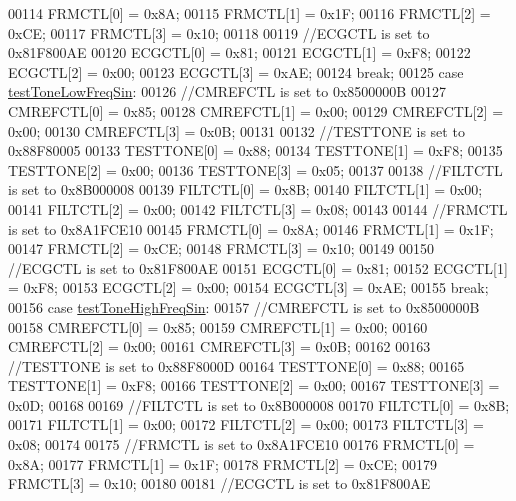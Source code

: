 \begin{DoxyCode}
00114         FRMCTL[0] = 0x8A;
00115         FRMCTL[1] = 0x1F;
00116         FRMCTL[2] = 0xCE;
00117         FRMCTL[3] = 0x10;
00118 
00119         \textcolor{comment}{//ECGCTL is set to 0x81F800AE}
00120         ECGCTL[0] = 0x81;
00121         ECGCTL[1] = 0xF8;
00122         ECGCTL[2] = 0x00;
00123         ECGCTL[3] = 0xAE;
00124         \textcolor{keywordflow}{break};
00125     \textcolor{keywordflow}{case} \hyperlink{group__Device-Facade_ggabf6e5cc9109a573e29add762dc36df9ba9ececd6d5264a0e5996556c6697a4f94}{testToneLowFreqSin}:
00126         \textcolor{comment}{//CMREFCTL is set to 0x8500000B}
00127         CMREFCTL[0] = 0x85;
00128         CMREFCTL[1] = 0x00;
00129         CMREFCTL[2] = 0x00;
00130         CMREFCTL[3] = 0x0B;
00131 
00132         \textcolor{comment}{//TESTTONE is set to 0x88F80005}
00133         TESTTONE[0] = 0x88;
00134         TESTTONE[1] = 0xF8;
00135         TESTTONE[2] = 0x00;
00136         TESTTONE[3] = 0x05;
00137 
00138         \textcolor{comment}{//FILTCTL is set to 0x8B000008}
00139         FILTCTL[0] = 0x8B;
00140         FILTCTL[1] = 0x00;
00141         FILTCTL[2] = 0x00;
00142         FILTCTL[3] = 0x08;
00143 
00144         \textcolor{comment}{//FRMCTL is set to 0x8A1FCE10}
00145         FRMCTL[0] = 0x8A;
00146         FRMCTL[1] = 0x1F;
00147         FRMCTL[2] = 0xCE;
00148         FRMCTL[3] = 0x10;
00149 
00150         \textcolor{comment}{//ECGCTL is set to 0x81F800AE}
00151         ECGCTL[0] = 0x81;
00152         ECGCTL[1] = 0xF8;
00153         ECGCTL[2] = 0x00;
00154         ECGCTL[3] = 0xAE;
00155         \textcolor{keywordflow}{break};
00156     \textcolor{keywordflow}{case} \hyperlink{group__Device-Facade_ggabf6e5cc9109a573e29add762dc36df9ba397d60b89ddb5aaf41d92c617868ed47}{testToneHighFreqSin}:
00157         \textcolor{comment}{//CMREFCTL is set to 0x8500000B}
00158         CMREFCTL[0] = 0x85;
00159         CMREFCTL[1] = 0x00;
00160         CMREFCTL[2] = 0x00;
00161         CMREFCTL[3] = 0x0B;
00162 
00163         \textcolor{comment}{//TESTTONE is set to 0x88F8000D}
00164         TESTTONE[0] = 0x88;
00165         TESTTONE[1] = 0xF8;
00166         TESTTONE[2] = 0x00;
00167         TESTTONE[3] = 0x0D;
00168 
00169         \textcolor{comment}{//FILTCTL is set to 0x8B000008}
00170         FILTCTL[0] = 0x8B;
00171         FILTCTL[1] = 0x00;
00172         FILTCTL[2] = 0x00;
00173         FILTCTL[3] = 0x08;
00174 
00175         \textcolor{comment}{//FRMCTL is set to 0x8A1FCE10}
00176         FRMCTL[0] = 0x8A;
00177         FRMCTL[1] = 0x1F;
00178         FRMCTL[2] = 0xCE;
00179         FRMCTL[3] = 0x10;
00180 
00181         \textcolor{comment}{//ECGCTL is set to 0x81F800AE}

\end{DoxyCode}
